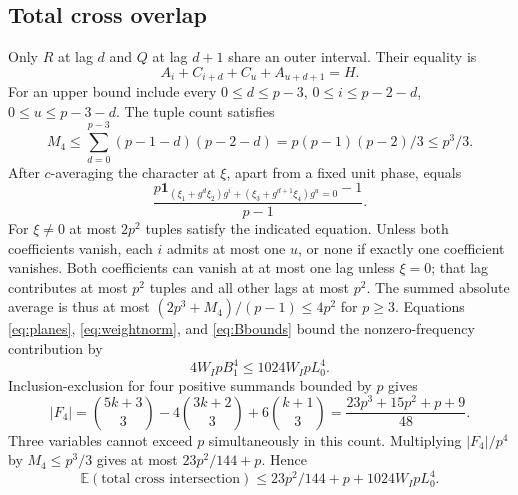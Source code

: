 \documentclass[10pt]{amsart}
\theoremstyle{remark}
\newcommand{\E}{\mathbb E}
\newcommand{\ind}{\mathbf 1}
\begin{document}
\subsection{Total cross overlap}
Only $R$ at lag $d$ and $Q$ at lag $d+1$ share an outer interval.
Their equality is
\begin{equation}\label{eq:crossintersection}
 A_i+C_{i+d}+C_u+A_{u+d+1}=H.
\end{equation}
For an upper bound include every $0\le d\le p-3$,
$0\le i\le p-2-d$, $0\le u\le p-3-d$. The tuple count satisfies
\[
 M_4\le\sum_{d=0}^{p-3}(p-1-d)(p-2-d)
 =p(p-1)(p-2)/3\le p^3/3.
\]
After $c$-averaging the character at $\xi$, apart from a fixed unit
phase, equals
\begin{equation}\label{eq:caverage}
 \frac{p\ind_{(\xi_1+g^d\xi_2)g^i+(\xi_3+g^{d+1}\xi_4)g^u=0}-1}{p-1}.
\end{equation}
For $\xi\ne0$ at most $2p^2$ tuples satisfy the indicated equation.
Unless both coefficients vanish, each $i$ admits at most one $u$,
or none if exactly one coefficient vanishes. Both coefficients can
vanish at at most one lag unless $\xi=0$; that lag contributes at
most $p^2$ tuples and all other lags at most $p^2$.
The summed absolute average is thus at most
$(2p^3+M_4)/(p-1)\le4p^2$ for $p\ge3$.
Equations \eqref{eq:planes}, \eqref{eq:weightnorm}, and
\eqref{eq:Bbounds} bound the nonzero-frequency contribution by
\begin{equation}\label{eq:crossfourerror}
 4W_IpB_1^4\le1024W_IpL_0^4.
\end{equation}
Inclusion-exclusion for four positive summands bounded by $p$ gives
\begin{equation}\label{eq:F4volume}
 |F_4|=\binom{5k+3}{3}-4\binom{3k+2}{3}+6\binom{k+1}{3}
 =\frac{23p^3+15p^2+p+9}{48}.
\end{equation}
Three variables cannot exceed $p$ simultaneously in this count.
Multiplying $|F_4|/p^4$ by $M_4\le p^3/3$ gives at most
$23p^2/144+p$. Hence
\begin{equation}\label{eq:totalcross}
 \E(\text{total cross intersection})
 \le23p^2/144+p+1024W_IpL_0^4.
\end{equation}
\end{document}
